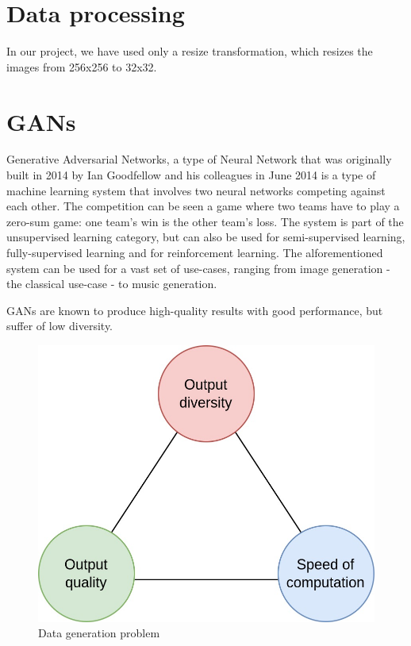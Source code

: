 \documentclass[conference]{IEEEtran}
\begin{document}
\section{Data processing}
    In our project, we have used only a resize transformation, which resizes the images from 256x256 to 32x32.

\section{GANs}
    Generative Adversarial Networks, a type of Neural Network that was originally built in 2014 by Ian Goodfellow and his
colleagues in June 2014 \cite{b1} is a type of machine learning system that involves two neural networks competing against
each other. The competition can be seen a game where two teams have to play a zero-sum game: one team's win is the other
team's loss. The system is part of the unsupervised learning category, but can also be used for semi-supervised learning,
fully-supervised learning and for reinforcement learning. The alforementioned system can be used for a vast set of use-cases,
ranging from image generation - the classical use-case - to music generation.

    GANs are known to produce high-quality results with good performance, but suffer of low diversity.

\begin{figure}[!h]
    \centering
    \includegraphics[scale=0.25]{images/generator problem.jpg}
    \caption{Data generation problem} \label{Data generation problem}
\end{figure}
\end{document}
